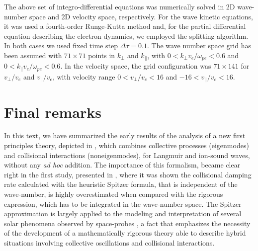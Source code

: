 \documentclass[12pt,a4paper,ruledheader]{report}
\begin{document}
The above set of integro-differential equations was numerically solved in
2D wave-number space and 2D velocity space, respectively. For the wave kinetic
equations, it was used a fourth-order Runge-Kutta method and, for the partial
differential equation describing the electron dynamics, we employed the
splitting algorithm. In both cases we used fixed time step $\Delta \tau=0.1$.
The wave number space grid has been assumed with $71\times 71$ points in
$k_{\perp}$ and $k_{\parallel}$, with $0<k_{\perp}v_e/\omega_{pe}<0.6$ and
$0<k_{\parallel}v_e/\omega_{pe}<0.6$. In the velocity space, the grid
configuration was  $71\times 141$ for $v_{\perp}/v_e$ and $v_{\parallel}/v_e$,
with velocity range $0<v_{\perp}/v_e<16$ and $-16<v_{\parallel}/v_e<16$.




\chapter{Final remarks}
\label{cha:final}
In this text, we have summarized the early results of the analysis of a new first
principles theory, depicted in , which combines collective
processes (eigenmodes) and collisional interactions (noneigenmodes), for Langmuir
and ion-sound waves, without any \emph{ad hoc} addition. The importance of this
formalism, became clear right in the first study, presented in ,
where it was shown the collisional damping rate calculated with the heuristic
Spitzer formula, that is independent of the wave-number, is highly overestimated
when compared with the rigorous expression, which has to be integrated in the
wave-number space. The Spitzer approximation is largely applied to the modeling
and interpretation of several solar phenomena observed by space-probes \cite{
  VWK2000,Hannah2009,ZVST11,KRB12,KF13,RR14,Reid2015}, a fact that emphasizes
the necessity of the development of a mathematically rigorous theory able to
describe hybrid situations involving collective oscillations and collisional
interactions.
\end{document}
